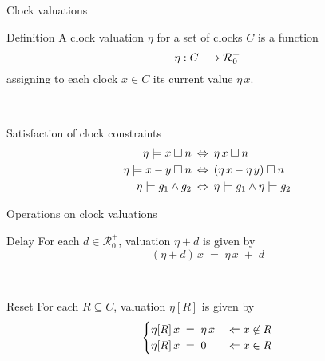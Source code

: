 \documentclass{beamer}
\def\dkb#1{{\blue #1}}
\def\R{\mathcal{R}}
\begin{document}
\begin{slide}{Clock valuations}
\small


\begin{block}{Definition}
A \dkb{clock valuation} $\eta$ for a set of clocks $C$ is a function 
\begin{equation*}
\fdec{\eta}{C}{\R_0^+}
\end{equation*}
assigning to each clock $x \in C$ its current value $\eta\, x$.
\end{block}
~\\

\begin{block}{Satisfaction of clock constraints}
\begin{align*}
\eta \models x \mathbin{\square} n \; & \mathbin{\Leftrightarrow}\; \eta\, x \mathbin{\square} n\\
\eta \models x-y \mathbin{\square} n \; & \mathbin{\Leftrightarrow}\; (\eta\, x - \eta\, y) \mathbin{\square} n\\
\eta \models g_1 \mathbin{\wedge} g_2 \; & \mathbin{\Leftrightarrow}\; \eta \models g_1 \mathbin{\wedge} \eta \models g_2
\end{align*}
\end{block}
\end{slide}

\begin{slide}{Operations on clock valuations}
\small


\begin{block}{Delay}
For each $d \in \R_0^+$, valuation $\eta + d$ is given by
\begin{equation*}
(\eta + d)\, x\; =\; \eta\, x\; +\; d
\end{equation*}
\end{block}
~\\

\begin{block}{Reset}
For each $R \subseteq C$, valuation $\eta[R]$ is given by
\begin{equation*}
\begin{cases}
\eta[R]\, x\; =\; \eta\, x & \; \mathbin{\Leftarrow}\; x \not\in R\\
\eta[R]\, x\; =\; 0 & \; \mathbin{\Leftarrow}\; x \in R
\end{cases}
\end{equation*}
\end{block}
\end{slide}
\end{document}
